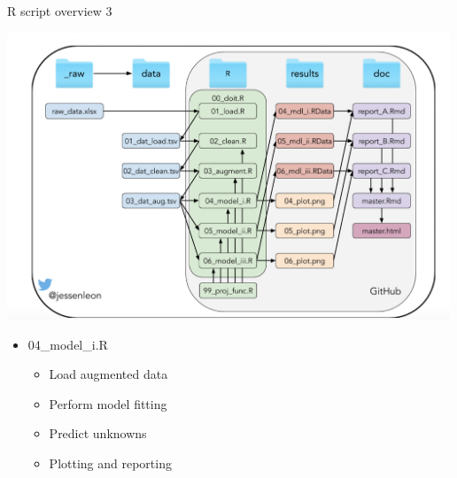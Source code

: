 \documentclass[ignorenonframetext,]{beamer}
\providecommand{\tightlist}{%
  \setlength{\itemsep}{0pt}\setlength{\parskip}{0pt}}
\begin{document}
\begin{frame}{R script overview 3}
\protect\hypertarget{r-script-overview-3}{}

\includegraphics[width=5.20833in,height=\textheight]{project_organisation.png}

\begin{itemize}
\tightlist
\item
  04\_model\_i.R

  \begin{itemize}
  \tightlist
  \item
    Load augmented data
  \item
    Perform model fitting
  \item
    Predict unknowns
  \item
    Plotting and reporting
  \end{itemize}
\end{itemize}

\end{frame}
\end{document}

